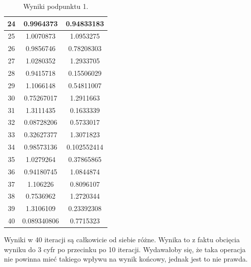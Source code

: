 \documentclass{article}
\begin{document}
\begin{table}[H]
\begin{tabular}{|c|c|c|}
24         & 0.9964373         & 0.94833183        \\ \hline
25         & 1.0070873         & 1.0953275         \\ \hline
26         & 0.9856746         & 0.78208303        \\ \hline
27         & 1.0280352         & 1.2933705         \\ \hline
28         & 0.9415718         & 0.15506029        \\ \hline
29         & 1.1066148         & 0.54811007        \\ \hline
30         & 0.75267017        & 1.2911663         \\ \hline
31         & 1.3111435         & 0.1633339         \\ \hline
32         & 0.08728206        & 0.5733017         \\ \hline
33         & 0.32627377        & 1.3071823         \\ \hline
34         & 0.98573136        & 0.102552414       \\ \hline
35         & 1.0279264         & 0.37865865        \\ \hline
36         & 0.94180745        & 1.0844874         \\ \hline
37         & 1.106226          & 0.8096107         \\ \hline
38         & 0.7536962         & 1.2720344         \\ \hline
39         & 1.3106109         & 0.23392308        \\ \hline
40         & 0.089340806       & 0.7715323         \\ \hline
\end{tabular}
\caption{Wyniki podpunktu 1.}
\label{tab:values}
\end{table}
Wyniki w 40 iteracji są całkowicie od siebie różne. Wynika to z faktu obcięcia wyniku do 3 cyfr po przecinku po 10 iteracji. Wydawałoby się, że taka operacja nie powinna mieć takiego wpływu na wynik końcowy, jednak jest to nie prawda.
\end{document}
